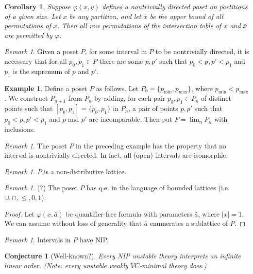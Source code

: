 \documentclass[final,a4paper,12pt]{amsart}
\newtheorem{cor}[thm]{Corollary}
\newtheorem{con}[thm]{Conjecture}
\theoremstyle{remark}
\newtheorem{rem}[thm]{Remark}
\theoremstyle{definition}
\newtheorem{ex}[thm]{Example}
\begin{document}
	\begin{cor}
		Suppose $\varphi(x,y)$ defines a nontrivially directed poset on partitions of a given size. Let $x$ be any partition, and let $\bar x$ be the upper bound of all permutations of $x$. Then all row permutations of the intersection table of $x$ and $\bar x$ are permitted by $\varphi$.
	\end{cor}
	
	\begin{rem}
		Given a poset $P$, for some interval in $P$ to be nontrivially directed, it is necessary that for all $p_0,p_1\in P$ there are some $p,p'$ such that $p_0<p,p'<p_1$ and $p_1$ is the supremum of $p$ and $p'$.
	\end{rem}
	
	\begin{ex}
		Define a poset $P$ as follows. Let $P_0=\{p_{\textrm{min}},p_{\textrm{max}}\}$, where $p_{\textrm{min}}<p_{\textrm{max}}$. We construct $P_{n+1}$ from $P_n$ by adding, for each pair $p_0,p_1\in P_n$ of distinct points such that $[p_0,p_1]=\{p_0,p_1\}$ in $P_n$, a pair of points $p,p'$ such that $p_0<p,p'<p_1$ and $p$ and $p'$ are incomparable. Then put $P=\lim_n P_n$ with inclusions.
	\end{ex}
	
	\begin{rem}
		The poset $P$ in the preceding example has the property that no interval is nontrivially directed. In fact, all (open) intervals are isomorphic.
	\end{rem}
	
	\begin{rem}
		$P$ is a non-distributive lattice.
	\end{rem}
	
	\begin{rem}(?)
		The poset $P$ has q.e. in the language of bounded lattices (i.e. $\cup,\cap,\leq,0,1$).
	\end{rem}
	\begin{proof}
		Let $\varphi(x,\bar a)$ be quantifier-free formula with parameters $\bar a$, where $\lvert x\rvert=1$. We can assume without loss of generality that $\bar a$ enumerates a sublattice of $P$.
	\end{proof}
	
	\begin{rem}
		Intervals in $P$ have NIP.
	\end{rem}
	
	\begin{con}[Well-known?]
		Every NIP unstable theory interprets an infinite linear order. (Note: every unstable weakly $VC$-minimal theory does.)
	\end{con}
	
\end{document}
